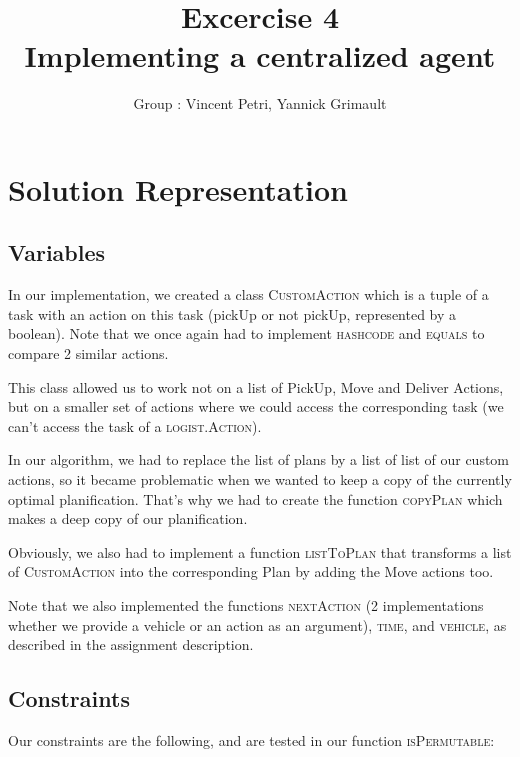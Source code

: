 \documentclass[11pt]{article}
\title{\bf Excercise 4\\ Implementing a centralized agent}
\author{Group \textnumero 3 : Vincent Petri, Yannick Grimault}
\begin{document}
\maketitle

\section{Solution Representation}

\subsection{Variables}
In our implementation, we created a class \textsc{CustomAction} which is a tuple of a task with an action on this task (pickUp or not pickUp, represented by a boolean). Note that we once again had to implement \textsc{hashcode} and \textsc{equals} to compare 2 similar actions.

This class allowed us to work not on a list of PickUp, Move and Deliver Actions, but on a smaller set of actions where we could access the corresponding task (we can't access the task of a \textsc{logist.Action}).

\vspace{5mm}

In our algorithm, we had to replace the list of plans by a list of list of our custom actions, so it became problematic when we wanted to keep a copy of the currently optimal planification. That's why we had to create the function \textsc{copyPlan} which makes a deep copy of our planification.

Obviously, we also had to implement a function \textsc{listToPlan} that transforms a list of \textsc{CustomAction} into the corresponding Plan by adding the Move actions too.

\vspace{5mm}

Note that we also implemented the functions \textsc{nextAction} (2 implementations whether we provide a vehicle or an action as an argument), \textsc{time}, and \textsc{vehicle}, as described in the assignment description.

\subsection{Constraints}
Our constraints are the following, and are tested in our function \textsc{isPermutable}:
\end{document}
